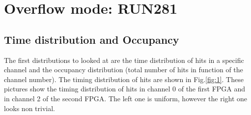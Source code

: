 
\section{Overflow mode: RUN281}
\subsection{Time distribution and Occupancy}\label{over}
The first distributions to looked at are the time distribution of hits in a specific channel and the occupancy distribution (total number of hits in function of the channel number).
The timing distribution of hits are shown in Fig.\ref{fig:1}.
These pictures show the timing distribution of hits in channel 0 of the first FPGA and in channel 2 of the second FPGA.
The left one is uniform, however the right one looks non trivial.

